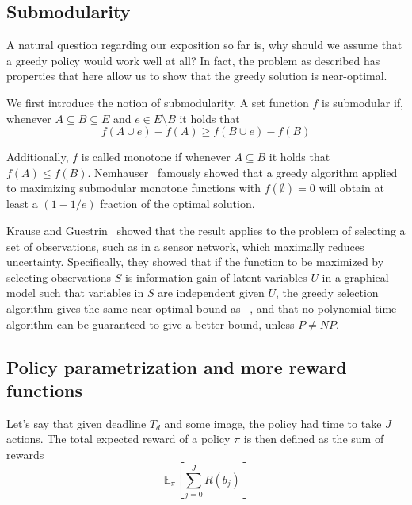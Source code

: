 \subsection{Submodularity} \label{sec:submodularity}
A natural question regarding our exposition so far is, why should we assume that a greedy policy would work well at all?
In fact, the problem as described has properties that here allow us to show that the greedy solution is near-optimal.

We first introduce the notion of submodularity.
A set function $f$ is submodular if, whenever $A \subseteq B \subseteq E$ and $e \in E \setminus B$ it holds that
\begin{equation}
f(A \cup {e}) - f(A) \geq f(B \cup {e}) - f(B)
\end{equation}

Additionally, $f$ is called monotone if whenever $A \subseteq B$ it holds that $f(A) \leq f(B)$.
Nemhauser~\cite{Nemhauser1978} famously showed that a greedy algorithm applied to maximizing submodular monotone functions with $f(\emptyset)=0$ will obtain at least a $(1-1/e)$ fraction of the optimal solution.

Krause and Guestrin~\cite{Krause2005a} showed that the result applies to the problem of selecting a set of observations, such as in a sensor network, which maximally reduces uncertainty.
Specifically, they showed that if the function to be maximized by selecting observations $S$ is information gain of latent variables $U$ in a graphical model such that variables in $S$ are independent given $U$, the greedy selection algorithm gives the same near-optimal bound as  ~\cite{Nemhauser1978}, and that no polynomial-time algorithm can be guaranteed to give a better bound, unless $P \neq NP$.


\subsection{Policy parametrization and more reward functions}

Let's say that given deadline $T_d$ and some image, the policy had time to take $J$ actions.
The total expected reward of a policy $\pi$ is then defined as the sum of rewards
\begin{equation}
\mathbb{E}_\pi[\sum_{j=0}^J R(b_j)]
\end{equation}

